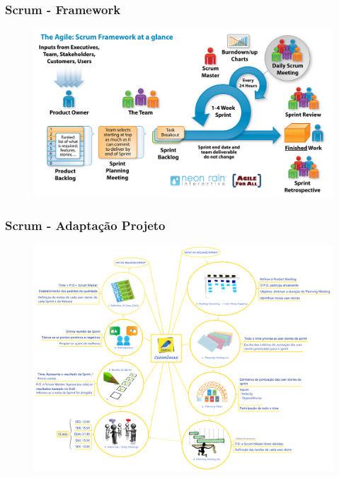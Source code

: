 \begin{frame}
 \frametitle{Scrum - Framework}
  \begin{figure}
   \centering
   \includegraphics[width = \textwidth]{figs/Scrum.jpg}
  \end{figure}
\end{frame}

\begin{frame}
 \frametitle{Scrum - Adaptação Projeto}
  \begin{figure}
   \centering
   \includegraphics[width = \textwidth]{figs/Cerimonia.png}
  \end{figure}
\end{frame}

